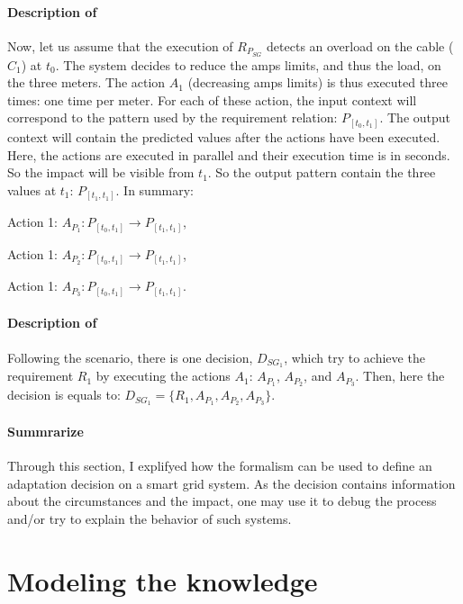 \paragraph{Description of }
Now, let us assume that the execution of $R_{P_{SG}}$ detects an overload on the cable ($C_1$) at $t_0$.
The system decides to reduce the amps limits, and thus the load, on the three meters.
The action $A_1$ (decreasing amps limits) is thus executed three times: one time per meter.
For each of these action, the input context will correspond to the pattern used by the requirement relation: $P_{[t_0, t_1]}$.
The output context will contain the predicted values after the actions have been executed.
Here, the actions are executed in parallel and their execution time is in seconds.
So the impact will be visible from $t_1$.
So the output pattern contain the three values at $t_1$:  $P_{[t_1, t_1]}$.
In summary:
\begin{condItemize}
	\item Action 1: $A_{P_1}: P_{[t_0, t_1]} \rightarrow P_{[t_1, t_1]}$,
	\item Action 1: $A_{P_2}: P_{[t_0, t_1]} \rightarrow P_{[t_1, t_1]}$,
	\item Action 1: $A_{P_3}: P_{[t_0, t_1]} \rightarrow P_{[t_1, t_1]}$.
\end{condItemize}


\paragraph{Description of }
Following the scenario, there is one decision, $D_{SG_1}$, which try to achieve the requirement $R_1$ by executing the actions $A_1$: $A_{P_1}$, $A_{P_2}$, and $A_{P_3}$.
Then, here the decision is equals to: $D_{SG_1} = \{R_1, A_{P_1}, A_{P_2}, A_{P_3}\}$.

\paragraph{Summrarize}
Through this section, I explifyed how the formalism can be used to define an adaptation decision on a smart grid system.
As the decision contains information about the circumstances and the impact, one may use it to debug the process and/or try to explain the behavior of such systems.

 
 
 \section{Modeling the knowledge}
 
